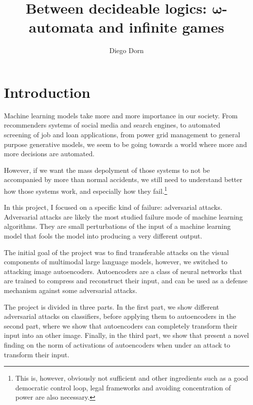 \documentclass[]{scrarticle}
\title{Between decideable logics: $\mathbf{\omega}$-automata and infinite games}
\author{Diego Dorn}
\begin{document}


\newpage


\section*{Introduction}

Machine learning models take more and more importance in our society.
From recommenders systems of social media and search engines,
to automated screening of job and loan applications,
from power grid management
to general purpose generative models,
we seem to be going towards a world where more and more decisions
are automated.

However, if we want the mass depolyment of those systems
to not be accompanied by more than normal accidents,
we still need to understand better how those systems work,
and especially how they fail.\footnote{
  This is, however, obviously not sufficient
  and other ingredients such as a good democratic control loop,
  legal frameworks and avoiding concentration of power
  are also necessary.}

In this project, I focused on a specific kind of failure:
adversarial attacks. Adversarial attacks are likely the most
studied failure mode of machine learning algorithms.
They are small perturbations
of the input of a machine learning model that
fools the model into producing a very different output.

The initial goal of the project was to find transferable attacks
on the visual components of multimodal large language models,
however, we switched to attacking image autoencoders.
Autoencoders are a class of neural networks that are trained
to compress and reconstruct their input, and can be used
as a defense mechanism against some adversarial attacks.

The project is divided in three parts. In the first part,
we show different adversarial attacks on classifiers,
before applying them to autoencoders in the second part,
where we show that autoencoders can completely
transform their input into an other image.
Finally, in the third part, we show that present
a novel finding on the norm of activations of
autoencoders when under an attack to transform their input.



\end{document}
